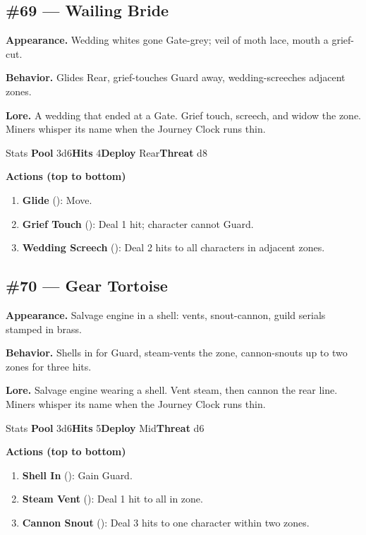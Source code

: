 \subsection*{\#69 --- Wailing Bride}

\textbf{Appearance.} Wedding whites gone Gate-grey; veil of moth lace, mouth a grief-cut.

\textbf{Behavior.} Glides Rear, grief-touches Guard away, wedding-screeches adjacent zones.

\textbf{Lore.} A wedding that ended at a Gate. Grief touch, screech, and widow the zone. Miners whisper its name when the Journey Clock runs thin.

\begin{monsterentry}{Stats}
\textbf{Pool} 3d6\quad\textbf{Hits} 4\quad\textbf{Deploy} Rear\quad\textbf{Threat} d8

\textbf{Actions (top to bottom)}
\begin{enumerate}\setlength{\itemsep}{0.15em}\setlength{\parskip}{0pt}
  \item \textbf{Glide} (\easy): Move.
  \item \textbf{Grief Touch} (\medium): Deal 1 hit; character cannot Guard.
  \item \textbf{Wedding Screech} (\hard): Deal 2 hits to all characters in adjacent zones.
\end{enumerate}
\end{monsterentry}

\subsection*{\#70 --- Gear Tortoise}

\textbf{Appearance.} Salvage engine in a shell: vents, snout-cannon, guild serials stamped in brass.

\textbf{Behavior.} Shells in for Guard, steam-vents the zone, cannon-snouts up to two zones for three hits.

\textbf{Lore.} Salvage engine wearing a shell. Vent steam, then cannon the rear line. Miners whisper its name when the Journey Clock runs thin.

\begin{monsterentry}{Stats}
\textbf{Pool} 3d6\quad\textbf{Hits} 5\quad\textbf{Deploy} Mid\quad\textbf{Threat} d6

\textbf{Actions (top to bottom)}
\begin{enumerate}\setlength{\itemsep}{0.15em}\setlength{\parskip}{0pt}
  \item \textbf{Shell In} (\easy): Gain Guard.
  \item \textbf{Steam Vent} (\medium): Deal 1 hit to all in zone.
  \item \textbf{Cannon Snout} (\hard): Deal 3 hits to one character within two zones.
\end{enumerate}
\end{monsterentry}


